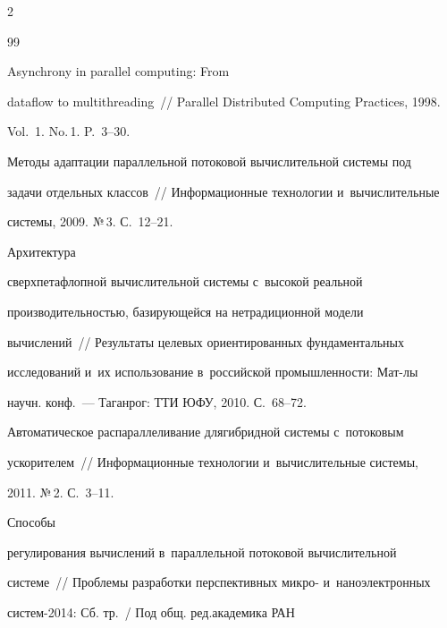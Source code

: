 \begin{multicols}{2}
{{\begin{thebibliography}{99}

   Asynchrony in parallel computing: From 

dataflow to multithreading~// Parallel Distributed Computing Practices, 1998. 

Vol.~1. No.\,1. P.~3--30.



Методы адаптации параллельной потоковой вычислительной системы под 

задачи отдельных классов~// Информационные технологии и~вычислительные 

системы, 2009. №\,3. С.~12--21.




   Архитектура 

сверхпетафлопной вычислительной системы с~высокой реальной 

производительностью, бази\-ру\-ющей\-ся на нетрадиционной модели 

вычислений~// Результаты целевых ориентированных фундаментальных 

исследований и~их использование в~российской промышленности: Мат-лы 

научн. конф.~--- Таганрог: ТТИ ЮФУ, 2010. С.~68--72.





Автоматическое распараллеливание для\linebreak гибридной системы с~потоковым 

ускорителем~// Информационные технологии и~вычислительные системы, 

2011. №\,2. С.~3--11.


   Способы 

регулирования вычислений в~параллельной потоковой вычислительной 

системе~// Проблемы разработки перспективных микро- и~наноэлектронных 

систем-2014: Сб. тр.~/ Под общ. ред.\linebreak академика РАН 


\end{thebibliography}}}
\end{multicols}
